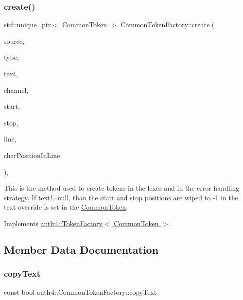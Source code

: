 \subsubsection{\texorpdfstring{create()}{create()}}
{\footnotesize\ttfamily std\+::unique\+\_\+ptr$<$ \hyperlink{classantlr4_1_1CommonToken}{Common\+Token} $>$ Common\+Token\+Factory\+::create (\begin{DoxyParamCaption}\item[{std\+::pair$<$ \hyperlink{classantlr4_1_1TokenSource}{Token\+Source} $\ast$, Char\+Stream $\ast$$>$}]{source,  }\item[{size\+\_\+t}]{type,  }\item[{const std\+::string \&}]{text,  }\item[{size\+\_\+t}]{channel,  }\item[{size\+\_\+t}]{start,  }\item[{size\+\_\+t}]{stop,  }\item[{size\+\_\+t}]{line,  }\item[{size\+\_\+t}]{char\+Position\+In\+Line }\end{DoxyParamCaption})\hspace{0.3cm}{\ttfamily [override]}, {\ttfamily [virtual]}}

This is the method used to create tokens in the lexer and in the error handling strategy. If text!=null, than the start and stop positions are wiped to -\/1 in the text override is set in the \hyperlink{classantlr4_1_1CommonToken}{Common\+Token}. 

Implements \hyperlink{classantlr4_1_1TokenFactory_a25efd6b38907e594ddc848887fbd7303}{antlr4\+::\+Token\+Factory$<$ Common\+Token $>$}.



\subsection{Member Data Documentation}
\mbox{\label{classantlr4_1_1CommonTokenFactory_a944c106da2cf4638ea989bcb20b482df}} 
\subsubsection{\texorpdfstring{copy\+Text}{copyText}}
{\footnotesize\ttfamily const bool antlr4\+::\+Common\+Token\+Factory\+::copy\+Text\hspace{0.3cm}{\ttfamily [protected]}}

